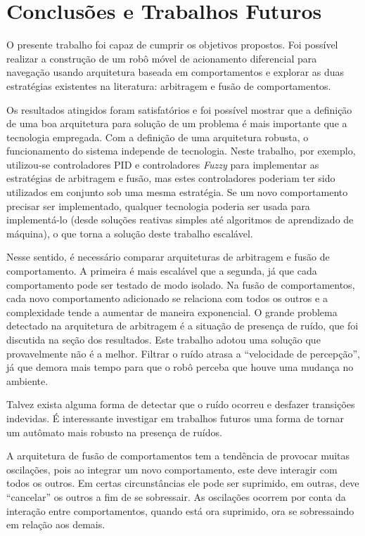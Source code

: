 \chapter{Conclusões e Trabalhos Futuros}
\vspace{-2.5 cm}

O presente trabalho foi capaz de cumprir os objetivos propostos. Foi possível realizar a
construção de um robô móvel de acionamento diferencial para navegação usando arquitetura 
baseada em comportamentos e explorar as duas estratégias existentes na literatura: arbitragem
e fusão de comportamentos. 
 
Os resultados atingidos foram satisfatórios e foi possível mostrar que a definição de uma 
boa arquitetura para solução de um problema é mais importante que a tecnologia empregada. 
Com a definição de uma arquitetura robusta, o funcionamento do sistema independe de 
tecnologia. Neste trabalho, por exemplo, utilizou-se controladores PID e controladores 
\textit{Fuzzy} para implementar as estratégias de arbitragem e fusão, mas estes controladores
poderiam ter sido utilizados em conjunto sob uma mesma estratégia. Se um novo comportamento 
precisar ser implementado, qualquer tecnologia poderia ser usada para implementá-lo 
(desde soluções reativas simples até algoritmos de aprendizado de máquina), o que torna a 
solução deste trabalho escalável.

Nesse sentido, é necessário comparar arquiteturas de arbitragem e fusão de comportamento. A primeira é mais escalável
que a segunda, já que cada comportamento pode ser testado de modo isolado. Na fusão de comportamentos, cada novo
comportamento adicionado se relaciona com todos os outros e a complexidade tende a aumentar de maneira exponencial.
O grande problema detectado na arquitetura de arbitragem é a situação de presença de ruído, que foi discutida na seção
dos resultados. Este trabalho adotou uma solução que provavelmente não é a melhor. Filtrar o ruído atrasa a 
``velocidade de percepção'', já que demora mais tempo para que o robô perceba que houve uma mudança no ambiente. 

Talvez exista alguma forma de detectar que o ruído ocorreu e desfazer transições indevidas. É interessante 
investigar em trabalhos futuros uma forma de tornar um autômato mais robusto na presença de ruídos. 

A arquitetura de fusão de comportamentos tem a tendência de provocar muitas oscilações, pois ao integrar 
um novo comportamento, este deve interagir com todos os outros. Em certas circunstâncias ele pode ser suprimido, em
outras, deve ``cancelar'' os outros a fim de se sobressair. As oscilações ocorrem por conta da interação entre 
comportamentos, quando está ora suprimido, ora se sobressaindo em relação aos demais.

